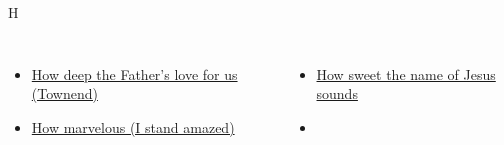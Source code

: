 \documentclass{beamer}
\begin{document}
\begin{frame}[t]{H}
\begin{columns}[t]
        \begin{itemize}
    \item \hyperlink{How deep the Father's love for us[](Townend)}{How deep the Father's love for us (Townend)} \phantom{}
    \item \hyperlink{I stand amazed['How marvelous']}{How marvelous (I stand amazed)} \phantom{ 1 1 1}
\end{itemize}
        \begin{itemize}
                    \item \hyperlink{How sweet the name of Jesus sounds[]}{How sweet the name of Jesus sounds } \phantom{}
    \item[] \phantom{1}\end{itemize}


\end{columns}

\end{frame}
\end{document}
